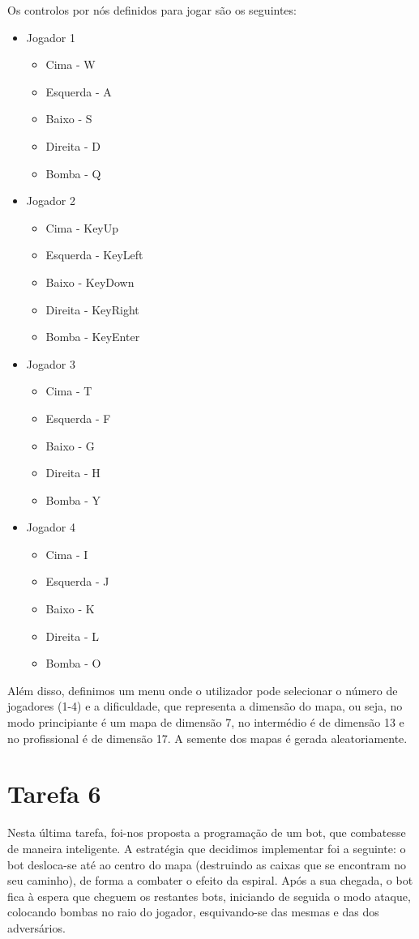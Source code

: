 \documentclass[a4paper]{article}
\begin{document}
Os controlos por nós definidos para jogar são os seguintes:
\begin{itemize}
\item Jogador 1
	\begin{itemize}
	\item Cima - W
	\item Esquerda - A
	\item Baixo - S
	\item Direita - D
	\item Bomba - Q
	\end{itemize}
\item Jogador 2
	\begin{itemize}
	\item Cima - KeyUp
	\item Esquerda - KeyLeft
	\item Baixo - KeyDown
	\item Direita - KeyRight
	\item Bomba - KeyEnter
	\end{itemize}
\item Jogador 3
	\begin{itemize}
	\item Cima - T
	\item Esquerda - F
	\item Baixo - G
	\item Direita - H
	\item Bomba - Y
	\end{itemize}
\item Jogador 4
	\begin{itemize}
	\item Cima - I
	\item Esquerda - J
	\item Baixo - K
	\item Direita - L
	\item Bomba - O
	\end{itemize}
\end{itemize}

Além disso, definimos um menu onde o utilizador pode selecionar o número de jogadores (1-4) e a dificuldade, que representa a dimensão do mapa, ou seja,
no modo principiante é um mapa de dimensão 7, no intermédio é de dimensão 13 e no profissional é de dimensão 17. A semente dos mapas é gerada aleatoriamente.

\section{Tarefa 6}
\label{t6}
Nesta última tarefa, foi-nos proposta a programação de um bot, que combatesse de maneira inteligente. A estratégia que decidimos implementar foi a seguinte: o bot desloca-se até ao centro do mapa (destruindo as caixas que se encontram no seu caminho), de forma a combater o efeito da espiral. Após a sua chegada, o bot fica à espera que cheguem os restantes bots, iniciando de seguida o modo ataque, colocando bombas no raio do jogador, esquivando-se das mesmas e das dos adversários.
\end{document}
